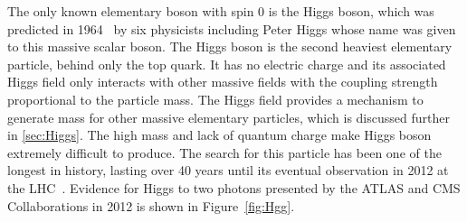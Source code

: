 The only known elementary boson with spin 0 is the Higgs boson, which was predicted in 1964~\cite{PhysRevLett.13.321,PhysRevLett.13.508,PhysRevLett.13.585} by six physicists including Peter Higgs whose name was given to this massive scalar boson. The Higgs boson is the second heaviest elementary particle, behind only the top quark. It has no electric charge and its associated Higgs field only interacts with other massive fields with the coupling strength proportional to the particle mass. The Higgs field provides a mechanism to generate mass for other massive elementary particles, which is discussed further in \autoref{sec:Higgs}. The high mass and lack of quantum charge make Higgs boson extremely difficult to produce. The search for this particle has been one of the longest in history, lasting over 40 years until its eventual observation in 2012 at the \ac{LHC}~\cite{ATLAS:2012yve,CMS:2012qbp}. Evidence for Higgs to two photons presented by the \ac{ATLAS} and \ac{CMS} Collaborations in 2012 is shown in Figure~\ref{fig:Hgg}.

